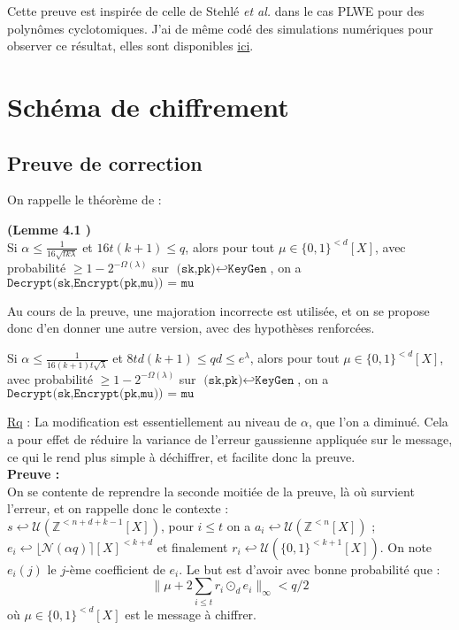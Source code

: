 \documentclass[11pt,a4paper]{article}
\begin{document}
Cette preuve est inspirée de celle de Stehlé \textit{et al.} \cite{hlawka} dans le cas PLWE pour des polynômes cyclotomiques. J'ai de même codé des simulations numériques pour observer ce résultat, elles sont disponibles \href{https://github.com/Hazdard/mplwe-sage/blob/main/mplwe.ipynb}{ici}.
\section{Schéma de chiffrement}

\subsection{Preuve de correction}

On rappelle le théorème de \cite{mplwe} : 
\begin{theorem}\textbf{(Lemme 4.1 \cite{mplwe})} \\
Si $\alpha \leq \frac{1}{16\sqrt{tk\lambda}}$ et  $16t(k+1)\leq q$, alors pour tout $\mu \in \{0,1\}^{<d}[X]$, avec probabilité $\geq 1 - 2^{-\Omega(\lambda)}$ sur $\texttt{(sk,pk)}\hookleftarrow\texttt{KeyGen} $, on a $\texttt{Decrypt(sk,Encrypt(pk,mu)) = mu}$ 
\end{theorem}

Au cours de la preuve, une majoration incorrecte est utilisée, et on se propose donc d'en donner une autre version, avec des hypothèses renforcées.

\begin{theorem}
Si $\alpha \leq \frac{1}{16(k+1)t\sqrt{\lambda}}$ et  $8td(k+1)\leq qd\leq e^\lambda$, alors pour tout $\mu \in \{0,1\}^{<d}[X]$, avec probabilité $\geq 1 - 2^{-\Omega(\lambda)}$ sur $\texttt{(sk,pk)}\hookleftarrow\texttt{KeyGen} $, on a $\texttt{Decrypt(sk,Encrypt(pk,mu)) = mu}$ 
\end{theorem}


\underline{Rq} : La modification est essentiellement au niveau de $\alpha$, que l'on a diminué. Cela a pour effet de réduire la variance de l'erreur gaussienne appliquée sur le message, ce qui le rend plus simple à déchiffrer, et facilite donc la preuve.
\\

\textbf{Preuve :} \\
On se contente de reprendre la seconde moitiée de la preuve, là où survient l'erreur, et on rappelle donc le contexte : \\

$s \hookleftarrow \mathcal{U}(\mathbb{Z}^{<n+d+k-1}[X])$, pour $i\leq t$ on a $a_i \hookleftarrow \mathcal{U}(\mathbb{Z}^{<n}[X])$ ; $e_i \hookleftarrow \lfloor \mathcal{N}(\alpha q)\rceil[X]^{<k+d}$ et finalement $r_i \hookleftarrow \mathcal{U}(\{0,1\}^{<k+1}[X])$. On note $e_i(j)$ le $j$-ème coefficient de $e_i$. Le but est d'avoir avec bonne probabilité que : 
\[\|\mu + 2\sum_{i \leq t}r_i \odot_d e_i  \|_\infty < q/2 \] où $\mu \in \{0,1\}^{<d}[X]$ est le message à chiffrer. 
\end{document}
